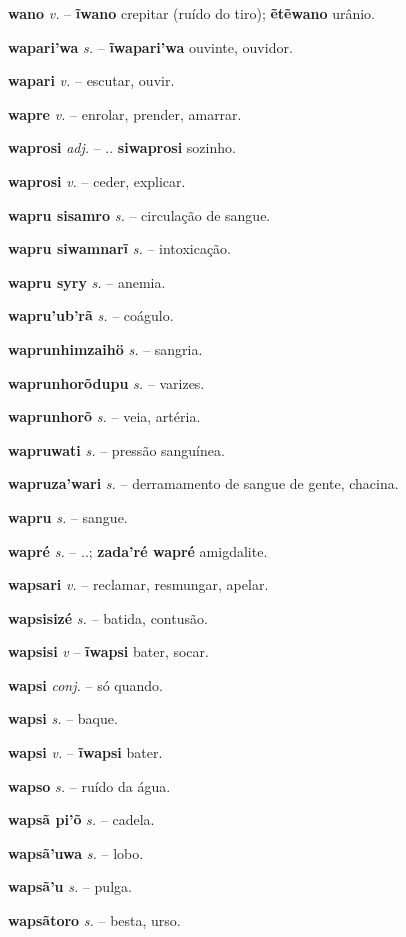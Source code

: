 \textbf{wano} \textit{v.} -- \textbf{ĩwano} crepitar (ruído do tiro); \textbf{ẽtẽwano} urânio.

\textbf{wapari'wa} \textit{s.} -- \textbf{ĩwapari'wa} ouvinte, ouvidor.

\textbf{wapari} \textit{v.} -- escutar, ouvir.

\textbf{wapre} \textit{v.} -- enrolar, prender, amarrar.

\textbf{waprosi} \textit{adj.} -- .. \textbf{siwaprosi} sozinho.

\textbf{waprosi} \textit{v.} -- ceder, explicar.

\textbf{wapru sisamro} \textit{s.} -- circulação de sangue.

\textbf{wapru siwamnarĩ} \textit{s.} -- intoxicação.

\textbf{wapru syry} \textit{s.} -- anemia.

\textbf{wapru'ub'rã} \textit{s.} -- coágulo.

\textbf{waprunhimzaihö} \textit{s.} -- sangria.

\textbf{waprunhorõdupu} \textit{s.} -- varizes.

\textbf{waprunhorõ} \textit{s.} -- veia, artéria.

\textbf{wapruwati} \textit{s.} -- pressão sanguínea.

\textbf{wapruza'wari} \textit{s.} -- derramamento de sangue de gente, chacina.

\textbf{wapru} \textit{s.} -- sangue.

\textbf{wapré} \textit{s.} -- ..; \textbf{zada'ré wapré} amigdalite.

\textbf{wapsari} \textit{v.} -- reclamar, resmungar, apelar.

\textbf{wapsisizé} \textit{s.} -- batida, contusão.

\textbf{wapsisi} \textit{v} -- \textbf{ĩwapsi} bater, socar.

\textbf{wapsi} \textit{conj.} -- só quando.

\textbf{wapsi} \textit{s.} -- baque.

\textbf{wapsi} \textit{v.} -- \textbf{ĩwapsi} bater.

\textbf{wapso} \textit{s.} -- ruído da água.

\textbf{wapsã pi'õ} \textit{s.} -- cadela.

\textbf{wapsã'uwa} \textit{s.} -- lobo.

\textbf{wapsã'u} \textit{s.} -- pulga.

\textbf{wapsãtoro} \textit{s.} -- besta, urso.

